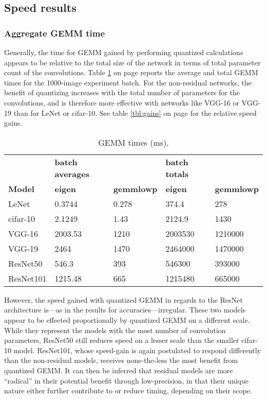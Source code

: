 \subsection{Speed results}
\subsubsection{Aggregate GEMM time}
Generally, the time for GEMM gained by performing quantized calculations appears to be relative to the total size of the network in terms of total parameter count of the convolutions. Table \ref{tbl:gemmtime} on page \pageref{tbl:gemmtime} reports the average and total GEMM times for the 1000-image experiment batch. For the non-residual networks, the benefit of quantizing increases with the total number of parameters for the convolutions, and is therefore more effective with networks like VGG-16 or VGG-19 than for LeNet or cifar-10. See table \ref{tbl:gains} on page \pageref{tbl:gains} for the relative speed gains.

\begin{table}[]
\centering
\caption[GEMM timings]{GEMM times (ms).}
\label{tbl:gemmtime}
\begin{tabular}{lllll}
& \textbf{batch averages}   &                              & \textbf{batch totals}     &     \\
\textbf{Model}     & \textbf{eigen} & \textbf{gemmlowp} & \textbf{eigen} & \textbf{gemmlowp} \\
LeNet     & 0.3744         & 0.278             & 374.4          & 278               \\
cifar-10  & 2.1249         & 1.43              & 2124.9         & 1430              \\
VGG-16    & 2003.53        & 1210              & 2003530        & 1210000           \\
VGG-19    & 2464           & 1470              & 2464000        & 1470000           \\
ResNet50  & 546.3          & 393               & 546300         & 393000            \\
ResNet101 & 1215.48        & 665               & 1215480        & 665000           
\end{tabular}
\end{table}

However, the speed gained with quantized GEMM in regards to the ResNet architecture is---as in the results for accuracies---irregular. These two models appear to be effected proportionally by quantized GEMM on a different scale. While they represent the models with the most number of convolution parameters, ResNet50 still reduces speed on a lesser scale than the smaller cifar-10 model. ResNet101, whose speed-gain is again postulated to respond differently than the non-residual models, receives none-the-less the most benefit from quantized GEMM. It can then be inferred that residual models are more ``radical'' in their potential benefit through low-precision, in that their unique nature either further contribute to or reduce timing, depending on their scope.

